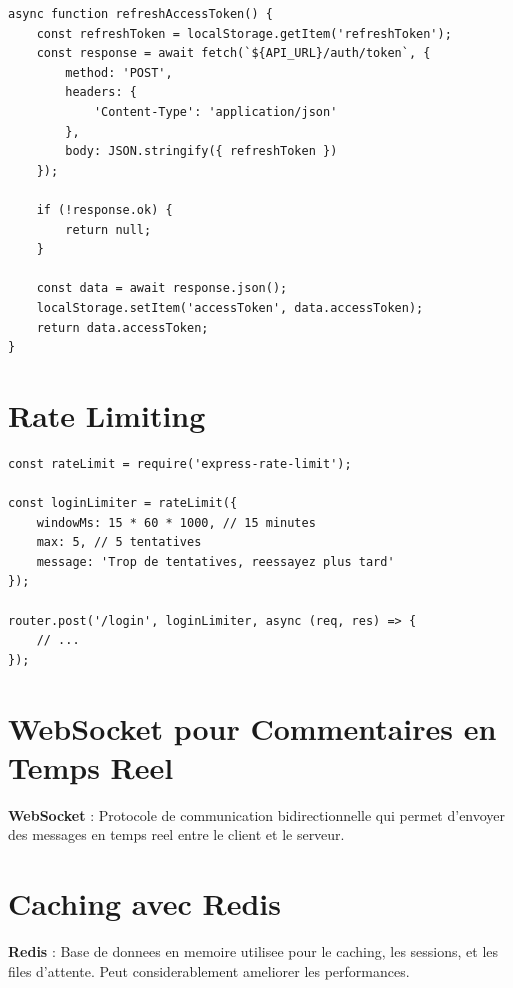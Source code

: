 \documentclass[a4paper,12pt]{book}
\begin{document}
\begin{lstlisting}[style=javascript, caption=Vue front-end du rafraichissement du token]
async function refreshAccessToken() {
    const refreshToken = localStorage.getItem('refreshToken');
    const response = await fetch(`${API_URL}/auth/token`, {
        method: 'POST',
        headers: {
            'Content-Type': 'application/json'
        },
        body: JSON.stringify({ refreshToken })
    });

    if (!response.ok) {
        return null;
    }

    const data = await response.json();
    localStorage.setItem('accessToken', data.accessToken);
    return data.accessToken;
}
\end{lstlisting}

\section{Rate Limiting}

\begin{lstlisting}[style=javascript, caption=Implementation du rate limiting]
const rateLimit = require('express-rate-limit');

const loginLimiter = rateLimit({
    windowMs: 15 * 60 * 1000, // 15 minutes
    max: 5, // 5 tentatives
    message: 'Trop de tentatives, reessayez plus tard'
});

router.post('/login', loginLimiter, async (req, res) => {
    // ...
});
\end{lstlisting}

\section{WebSocket pour Commentaires en Temps Reel}

\begin{definitionbox}
    \textbf{WebSocket} : Protocole de communication bidirectionnelle qui permet d'envoyer des messages en temps reel entre le client et le serveur.
\end{definitionbox}

\section{Caching avec Redis}

\begin{definitionbox}
    \textbf{Redis} : Base de donnees en memoire utilisee pour le caching, les sessions, et les files d'attente. Peut considerablement ameliorer les performances.
\end{definitionbox}
\end{document}
